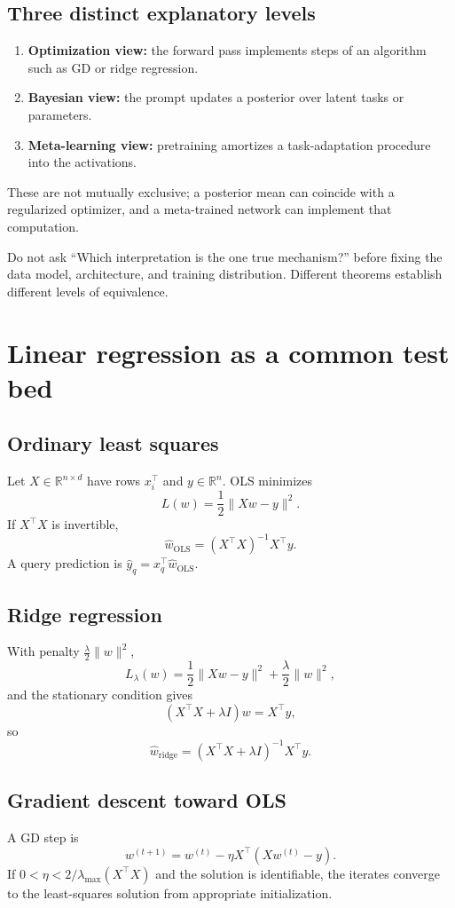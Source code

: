 \documentclass[11pt,a4paper,oneside,openany]{memoir}
\newcommand{\R}{\mathbb{R}}
\theoremstyle{definition}
\begin{document}
\section{Three distinct explanatory levels}
\begin{enumerate}
\item \textbf{Optimization view:} the forward pass implements steps of an algorithm such as GD or ridge regression.
\item \textbf{Bayesian view:} the prompt updates a posterior over latent tasks or parameters.
\item \textbf{Meta-learning view:} pretraining amortizes a task-adaptation procedure into the activations.
\end{enumerate}
These are not mutually exclusive; a posterior mean can coincide with a regularized optimizer, and a meta-trained network can implement that computation.

\begin{presentbox}
Do not ask ``Which interpretation is the one true mechanism?'' before fixing the data model, architecture, and training distribution.  Different theorems establish different levels of equivalence.
\end{presentbox}

\chapter{Linear regression as a common test bed}
\section{Ordinary least squares}
Let $X\in\R^{n\times d}$ have rows $x_i^\top$ and $y\in\R^n$.  OLS minimizes
\[
L(w)=\frac12\|Xw-y\|^2.
\]
If $X^\top X$ is invertible,
\[
\hat w_{\mathrm{OLS}}=(X^\top X)^{-1}X^\top y.
\]
A query prediction is $\hat y_q=x_q^\top\hat w_{\mathrm{OLS}}$.

\section{Ridge regression}
With penalty $\frac\lambda2\|w\|^2$,
\[
L_\lambda(w)=\frac12\|Xw-y\|^2+\frac\lambda2\|w\|^2,
\]
and the stationary condition gives
\[
(X^\top X+\lambda I)w=X^\top y,
\]
so
\[
\boxed{\hat w_{\mathrm{ridge}}=(X^\top X+\lambda I)^{-1}X^\top y.}
\]

\section{Gradient descent toward OLS}
A GD step is
\[
w^{(t+1)}=w^{(t)}-\eta X^\top(Xw^{(t)}-y).
\]
If $0<\eta<2/\lambda_{\max}(X^\top X)$ and the solution is identifiable, the iterates converge to the least-squares solution from appropriate initialization.
\end{document}
